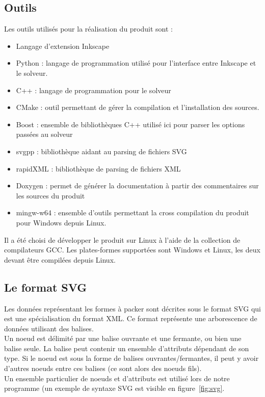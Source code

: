 \subsection{Outils}
Les outils utilisés pour la réalisation du produit sont :
\begin{itemize}
    \item Langage d'extension Inkscape
    \item Python : langage de programmation utilisé pour l'interface entre Inkscape et le solveur.
    \item C++ : langage de programmation pour le solveur
    \item CMake : outil permettant de gérer la compilation et l'installation des sources.
    \item Boost : ensemble de bibliothèques C++ utilisé ici pour parser les options passées au solveur
    \item svgpp : bibliothèque aidant au parsing de fichiers SVG
    \item rapidXML : bibliothèque de parsing de fichiers XML
    \item Doxygen : permet de générer la documentation à partir des commentaires sur les sources du produit
    \item mingw-w64 : ensemble d'outils permettant la cross compilation du produit pour Windows depuis Linux.
    
\end{itemize}

\vspace{1em}
Il a été choisi de développer le produit sur Linux à l'aide de la collection de compilateurs GCC. Les plates-formes supportées sont Windows et Linux, les deux devant être compilées depuis Linux.

\subsection{Le format SVG}

\indent Les données représentant les formes à packer sont décrites sous le format SVG qui est une spécialisation du format XML. Ce format représente une arborescence de données utilisant des balises.\\

Un noeud est délimité par une balise ouvrante et une fermante, ou bien une balise seule. La balise peut contenir un ensemble d'attributs dépendant de son type. Si le noeud est sous la forme de balises ouvrantes/fermantes, il peut y avoir d'autres noeuds entre ces balises (ce sont alors des noeuds fils).\\
Un ensemble particulier de noeuds et d'attributs est utilisé lors de notre programme (un exemple de syntaxe SVG est visible en figure~\ref{fig:svg}.

